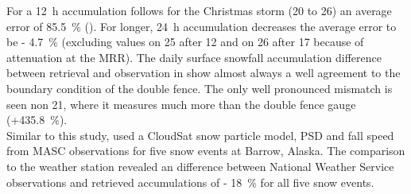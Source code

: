 For a \SI{12}{\hour} accumulation follows for the Christmas storm (\num{20} to \SI{26}{\dec}) an average error of \SI{85.5}{\percent} (). For longer, \SI{24}{\hour} accumulation decreases the average error to be \SI{- 4.7}{\percent} (excluding values on \SI{25}{\dec} after \SI{12}{\UTC} and on \SI{26}{\dec} after \SI{17}{\UTC} because of attenuation at the MRR). The daily surface snowfall accumulation difference between retrieval and observation in  show almost always a well agreement to the boundary condition of the double fence. The only well pronounced mismatch is seen non \SI{21}{\dec}, where it measures much more than the double fence gauge (+\SI{435.8}{\percent}). 
\\
Similar to this study, \citet{cooper_variational_2017} used a CloudSat snow particle model, PSD and fall speed from MASC observations for five snow events at Barrow, Alaska. The comparison to the weather station revealed an difference between National Weather Service observations and retrieved accumulations of \SI{- 18}{\percent} for all five snow events.
